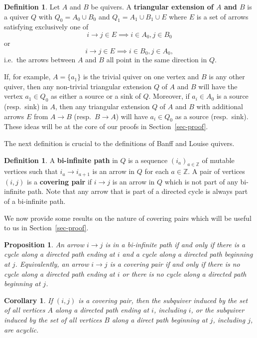 \documentclass[10pt]{amsart}
\newtheorem{prop}[thm]{Proposition}
\newtheorem{coro}[thm]{Corollary}
\theoremstyle{definition}
\newtheorem{defi}[thm]{Definition}
\theoremstyle{remark}
\newcommand{\ie}{i.e.\ }
\newcommand{\resp}{resp.\ }
\newcommand{\ZZ}{\mathbb{Z}}
\begin{document}
\begin{defi}\label{def-triangular-extension}
    Let $A$ and $B$ be quivers. 
    A \textbf{triangular extension of $A$ and $B$} is a quiver $Q$ with $Q_0 = A_0 \cup B_0$ and $Q_1 = A_1 \cup B_1 \cup E$ where $E$ is a set of arrows satisfying exclusively one of
    $$i \to j \in E \implies i \in A_0, j \in B_0$$
    or 
    $$i \to j \in E \implies i \in B_0, j \in A_0,$$
    \ie the arrows between $A$ and $B$ all point in the same direction in $Q$.
\end{defi}

If, for example, $A = \{a_1\}$ is the trivial quiver on one vertex and $B$ is any other quiver, then any non-trivial triangular extension $Q$ of $A$ and $B$ will have the vertex $a_1 \in Q_0$ as either a source or a sink of $Q$. 
Moreover, if $a_i \in A_0$ is a source (\resp sink) in $A$, then any triangular extension $Q$ of $A$ and $B$ with additional arrows $E$ from $A \to B$ (\resp $B \to A$) will have $a_i \in Q_0$ as a source (\resp sink).
These ideas will be at the core of our proofs in Section~\ref{sec-proof}.

The next definition is crucial to the definitions of Banff and Louise quivers.

\begin{defi}\label{def-biinfitnite}
    A \textbf{bi-infinite path} in $Q$ is a sequence $(i_a)_{a \in \ZZ}$ of mutable vertices such that $i_a \to i_{a+1}$ is an arrow in $Q$ for each $a \in \ZZ$. 
    A pair of vertices $(i,j)$ is a \textbf{covering pair} if $i \to j$ is an arrow in $Q$ which is not part of any bi-infinite path.
    Note that any arrow that is part of a directed cycle is always part of a bi-infinite path.
 \end{defi}

 We now provide some results on the nature of covering pairs which will be useful to us in Section~\ref{sec-proof}.

\begin{prop}{\cite[Proposition 5.1]{MR2995670}} \label{prop-acyclic-covering-pair}
    An arrow $i \to j$ is in a bi-infinite path if and only if there is a cycle along a directed path ending at $i$ and a cycle along a directed path beginning at $j$.
    Equivalently, an arrow $i \to j$ is a covering pair if and only if there is no cycle along a directed path ending at $i$ or there is no cycle along a directed path beginning at $j$.
\end{prop}

\begin{coro} \label{cor-acyclic-covering-pair}
    If $(i,j)$ is a covering pair, then the subquiver induced by the set of all vertices $A$ along a directed path ending at $i$, including $i$, or the subquiver induced by the set of all vertices $B$ along a direct path beginning at $j$, including $j$, are acyclic.
\end{coro}
\end{document}
